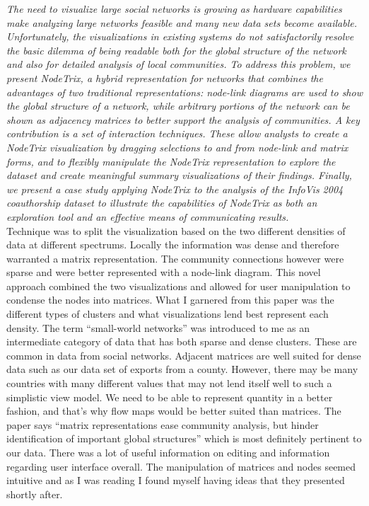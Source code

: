 \textit{The need to visualize large social networks is growing as hardware capabilities make analyzing large networks feasible and many new data sets become available. Unfortunately, the visualizations in existing systems do not satisfactorily resolve the basic dilemma of being readable both for the global structure of the network and also for detailed analysis of local communities. To address this problem, we present NodeTrix, a hybrid representation for networks that combines the advantages of two traditional representations: node-link diagrams are used to show the global structure of a network, while arbitrary portions of the network can be shown as adjacency matrices to better support the analysis of communities. A key contribution is a set of interaction techniques. These allow analysts to create a NodeTrix visualization by dragging selections to and from node-link and matrix forms, and to flexibly manipulate the NodeTrix representation to explore the dataset and create meaningful summary visualizations of their findings. Finally, we present a case study applying NodeTrix to the analysis of the InfoVis 2004 coauthorship dataset to illustrate the capabilities of NodeTrix as both an exploration tool and an effective means of communicating results.}\\
Technique was to split the visualization based on the two different densities of data at different spectrums. Locally the information was dense and therefore warranted a matrix representation. The community connections however were sparse and were better represented with a node-link diagram. This novel approach combined the two visualizations and allowed for user manipulation to condense the nodes into matrices.
What I garnered from this paper was the different types of clusters and what visualizations lend best represent each density. The term “small-world networks” was introduced to me as an intermediate category of data that has both sparse and dense clusters. These are common in data from social networks. Adjacent matrices are well suited for dense data such as our data set of exports from a county. However, there may be many countries with many different values that may not lend itself well to such a simplistic view model. We need to be able to represent quantity in a better fashion, and that’s why flow maps would be better suited than matrices. The paper says “matrix representations ease community analysis, but hinder identification of important global structures” which is most definitely pertinent to our data.
There was a lot of useful information on editing and information regarding user interface overall. The manipulation of matrices and nodes seemed intuitive and as I was reading I found myself having ideas that they presented shortly after.\\
